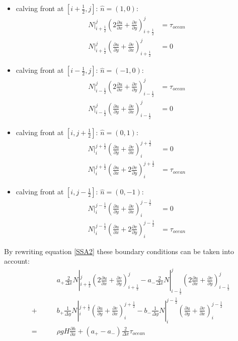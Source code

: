 \documentclass[a4paper,10pt]{article}
\begin{document}
\begin{itemize} 
\item calving front at $[i+\frac{1}{2},j]$: $\hat{n}=(1,0)$: 
\begin{align}
N|_{i+\frac{1}{2}}^j\left(2\frac{\partial u}{\partial x} + \frac{\partial v}{\partial y} \right)_{i+\frac{1}{2}}^j &= \tau_{ocean} \nonumber \\
N|_{i+\frac{1}{2}}^j\left(\frac{\partial u}{\partial y} + \frac{\partial v}{\partial x} \right)_{i+\frac{1}{2}}^j &= 0
\end{align}
\item calving front at $[i-\frac{1}{2},j]$: $\hat{n}=(-1,0)$: 
\begin{align}
N|_{i-\frac{1}{2}}^j\left(2\frac{\partial u}{\partial x} + \frac{\partial v}{\partial y} \right)_{i-\frac{1}{2}}^j &= \tau_{ocean} \nonumber \\
N|_{i-\frac{1}{2}}^j\left(\frac{\partial u}{\partial y} + \frac{\partial v}{\partial x} \right)_{i-\frac{1}{2}}^j &= 0
\end{align}
\item calving front at $[i,j+\frac{1}{2}]$: $\hat{n}=(0,1)$: 
\begin{align}
N|_{i}^{j+\frac{1}{2}}\left(\frac{\partial u}{\partial y} + \frac{\partial v}{\partial x} \right)_{i}^{j+\frac{1}{2}} &= 0 \nonumber \\
N|_{i}^{j+\frac{1}{2}}\left(\frac{\partial u}{\partial x} + 2\frac{\partial v}{\partial y} \right)_{i}^{j+\frac{1}{2}} &= \tau_{ocean}
\end{align}
\item calving front at $[i,j-\frac{1}{2}]$: $\hat{n}=(0,-1)$: 
\begin{align}
N|_{i}^{j-\frac{1}{2}}\left(\frac{\partial u}{\partial y} + \frac{\partial v}{\partial x} \right)_{i}^{j-\frac{1}{2}} &= 0 \nonumber \\
N|_{i}^{j-\frac{1}{2}}\left(\frac{\partial u}{\partial x} + 2\frac{\partial v}{\partial y} \right)_{i}^{j-\frac{1}{2}} &= \tau_{ocean}
\end{align}
\end{itemize}
By rewriting equation \eqref{SSA2} these boundary conditions can be taken into account:
\begin{align}
&\qquad a_+\frac{2}{\Delta x}N|_{i+\frac{1}{2}}^j\left( 2\frac{\partial u}{\partial x} + \frac{\partial v}{\partial y} \right)_{i+\frac{1}{2}}^j
- a_-\frac{2}{\Delta x}N|_{i-\frac{1}{2}}^j\left( 2\frac{\partial u}{\partial x} + \frac{\partial v}{\partial y} \right)_{i-\frac{1}{2}}^j \nonumber \\
+ &\qquad b_+\frac{1}{\Delta y}N|_i^{j+\frac{1}{2}}\left(\frac{\partial u}{\partial y}+\frac{\partial v}{\partial x}\right)_i^{j+\frac{1}{2}} 
- b_-\frac{1}{\Delta y}N|_i^{j-\frac{1}{2}}\left(\frac{\partial u}{\partial y}+\frac{\partial v}{\partial x}\right)_i^{j-\frac{1}{2}} \nonumber \\
= &\qquad \rho gH \frac{\partial h}{\partial x} + (a_+ - a_-)\frac{2}{\Delta x}\tau_{ocean} \label{SSA1_dis2}
\end{align}
\end{document}
